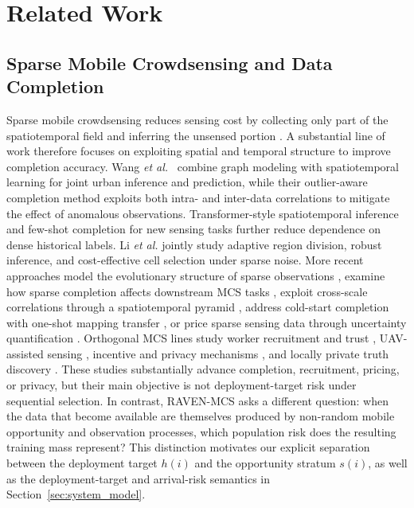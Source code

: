 \documentclass[letterpaper,journal]{IEEEtran}
\begin{document}
\section{Related Work}
\label{sec:related_work}

\subsection{Sparse Mobile Crowdsensing and Data Completion}

Sparse mobile crowdsensing reduces sensing cost by collecting only part of the
spatiotemporal field and inferring the unsensed portion
\cite{ganti2011mobile,guo2015mobile,ma2014opportunities}.  A substantial line of
work therefore focuses on exploiting spatial and temporal structure to improve
completion accuracy.  Wang \emph{et al.}~\cite{wang2023spatiotemporal} combine
graph modeling with spatiotemporal learning for joint urban inference and
prediction, while their outlier-aware completion method
\cite{wang2023outlier} exploits both intra- and inter-data correlations to
mitigate the effect of anomalous observations.  Transformer-style
spatiotemporal inference \cite{wang2023transformer} and few-shot completion for
new sensing tasks \cite{wang2024fewshot} further reduce dependence on dense
historical labels.  Li \emph{et al.}
\cite{li2024robust} jointly study adaptive region division, robust inference,
and cost-effective cell selection under sparse noise.  More recent approaches
model the evolutionary structure of sparse observations
\cite{wang2025evolutionary}, examine how sparse completion affects downstream
MCS tasks \cite{xu2025rethinking}, exploit cross-scale correlations through
a spatiotemporal pyramid \cite{liu2026pyramid}, address cold-start completion
with one-shot mapping transfer \cite{zhang2026mapt}, or price sparse sensing
data through uncertainty quantification \cite{liu2026pricing}.
Orthogonal MCS lines study worker recruitment and trust
\cite{liu2025towards,liu2026multidimensional,liu2025tdi}, UAV-assisted sensing
\cite{liu2025hybrid}, incentive and privacy mechanisms
\cite{zhang2025incentive,lu2025piece,liu2026verifiable}, and locally private
truth discovery \cite{zhang2026locally}.  These studies substantially
advance completion, recruitment, pricing, or privacy, but their main objective
is not deployment-target risk under sequential selection.
In contrast, RAVEN-MCS asks a different question: when the data that become
available are themselves produced by non-random mobile opportunity and
observation processes, which population risk does the resulting training mass
represent?  This distinction motivates our explicit separation between the
deployment target $h(i)$ and the opportunity stratum $s(i)$, as well as the
deployment-target and arrival-risk semantics in Section~\ref{sec:system_model}.
\end{document}

